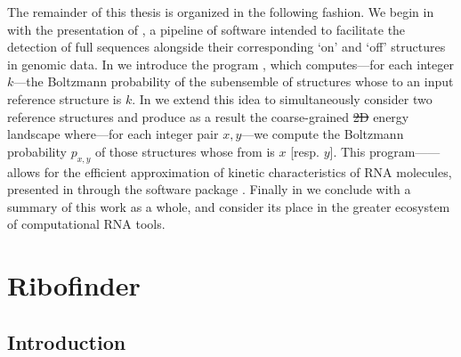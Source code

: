 \documentclass[11pt, oneside]{Thesis} %
\providecommand{\DIFdel}[1]{{\protect\color{red}\sout{#1}}}                      %
\providecommand{\DIFaddbegin}{} %
\providecommand{\DIFaddend}{} %
\providecommand{\DIFdelbegin}{} %
\providecommand{\DIFdelend}{} %
\begin{document}
The remainder of this thesis is organized in the following fashion. We begin in
 with the presentation of \rfinder, a pipeline of
software intended to facilitate the detection of full \rb sequences
alongside their corresponding `on' and `off' structures in genomic data. In
 we introduce the program \fftbor, which computes---for
each integer $k$---the Boltzmann probability \pk of the subensemble of structures
whose \bpd to an input reference structure \str is $k$.
In  we extend this idea to simultaneously consider two
reference structures \strST and produce as a result the coarse-grained \DIFdelbegin \DIFdel{2D }\DIFdelend \DIFaddbegin \twoD \DIFaddend energy
landscape where---for each integer pair $x,y$---we compute the Boltzmann
probability $p_{x,y}$
of those structures whose \bpd from  is $x$
[resp. $y$]. This program---\ffttwo---allows for the efficient approximation of
kinetic characteristics of RNA molecules, presented in 
through the software package \hermes. Finally in  we conclude
with a summary of this work as a whole, and consider its place in the greater
ecosystem of computational RNA tools.



\newcommand{\fnaRetrievalTime}{\formatdate{25}{11}{2014} at \formattime{9}{14}{0}}

\chapter{Ribofinder}
\label{ch:rfinder}


\section{Introduction}
\label{sec:rfinder:intro}
\end{document}
